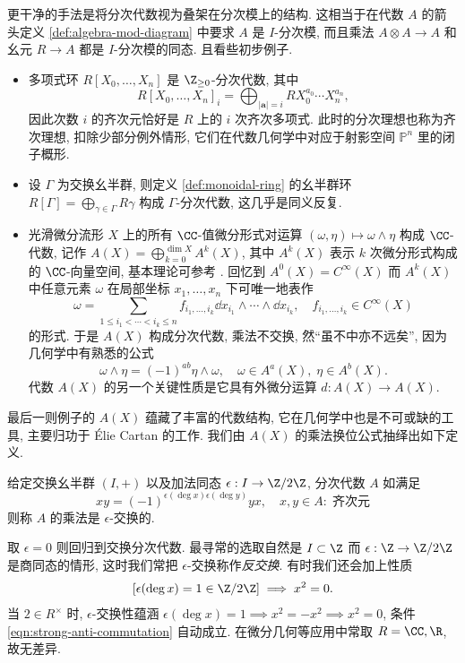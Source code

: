 更干净的手法是将分次代数视为叠架在分次模上的结构. 这相当于在代数 $A$ 的箭头定义 \ref{def:algebra-mod-diagram} 中要求 $A$ 是 $I$-分次模, 而且乘法 $A \otimes A \to A$ 和幺元 $R \to A$ 都是 $I$-分次模的同态. 且看些初步例子.

\begin{itemize}
	\item 多项式环 $R[X_0, \ldots, X_n]$ 是 $\Z_{\geq 0}$-分次代数, 其中
		\[ R[X_0, \ldots, X_n]_i = \bigoplus_{|\bm{a}|=i} R X_0^{a_0}  \cdots X_n^{a_n}, \]
		因此次数 $i$ 的齐次元恰好是 $R$ 上的 $i$ 次齐次多项式. 此时的分次理想也称为齐次理想, 扣除少部分例外情形, 它们在代数几何学中对应于射影空间 $\mathbb{P}^n$ 里的闭子概形.
	\item 设 $\Gamma$ 为交换幺半群, 则定义 \ref{def:monoidal-ring} 的幺半群环 $R[\Gamma] = \bigoplus_{\gamma \in \Gamma} R\gamma$ 构成 $\Gamma$-分次代数, 这几乎是同义反复.
	\item 光滑微分流形 $X$ 上的所有 $\CC$-值微分形式对运算 $(\omega, \eta) \mapsto \omega \wedge \eta$ 构成 $\CC$-代数, 记作 $A(X) = \bigoplus_{k=0}^{\dim X} A^k(X)$, 其中 $A^k(X)$ 表示 $k$ 次微分形式构成的 $\CC$-向量空间, 基本理论可参考 \cite[\S 3.2]{ChCh}. 回忆到 $A^0(X) = C^\infty(X)$ 而 $A^k(X)$ 中任意元素 $\omega$ 在局部坐标 $x_1, \ldots, x_n$ 下可唯一地表作
	\[ \omega = \sum_{1 \leq i_1 < \cdots < i_k \leq n} f_{i_1, \ldots, i_k} \dd x_{i_1} \wedge \cdots \wedge \dd x_{i_k}, \quad f_{i_1, \ldots, i_k} \in C^\infty(X) \]
	的形式. 于是 $A(X)$ 构成分次代数, 乘法不交换, 然``虽不中亦不远矣'', 因为几何学中有熟悉的公式
	\[  \omega \wedge \eta = (-1)^{ab} \eta \wedge \omega, \quad \omega \in A^a(X), \; \eta \in A^b(X). \]
	代数 $A(X)$ 的另一个关键性质是它具有外微分运算 $d: A(X) \to A(X)$.
\end{itemize}
最后一则例子的 $A(X)$ 蕴藏了丰富的代数结构, 它在几何学中也是不可或缺的工具, 主要归功于 Élie Cartan 的工作. 我们由 $A(X)$ 的乘法换位公式抽绎出如下定义.

\begin{definition}\label{def:anti-commutation}
	给定交换幺半群 $(I, +)$ 以及加法同态 $\epsilon: I \to \Z/2\Z$, 分次代数 $A$ 如满足
	\[ xy = (-1)^{\epsilon(\deg x) \epsilon(\deg y)} yx, \quad x, y \in A: \;\text{齐次元} \]
	则称 $A$ 的乘法是 $\epsilon$-交换的.
\end{definition}
取 $\epsilon=0$ 则回归到交换分次代数. 最寻常的选取自然是 $I \subset \Z$ 而 $\epsilon: \Z \to \Z/2\Z$ 是商同态的情形, 这时我们常把 $\epsilon$-交换称作\emph{反交换}. 有时我们还会加上性质
\begin{gather}\label{eqn:strong-anti-commutation}
	\left[ \epsilon(\deg x) = 1 \in \Z/2\Z \right] \implies x^2 = 0.
\end{gather}
当 $2 \in R^\times$ 时, $\epsilon$-交换性蕴涵 $\epsilon(\deg x)=1 \implies x^2 = -x^2 \implies x^2=0$, 条件 \eqref{eqn:strong-anti-commutation} 自动成立. 在微分几何等应用中常取 $R = \CC, \R$, 故无差异.

